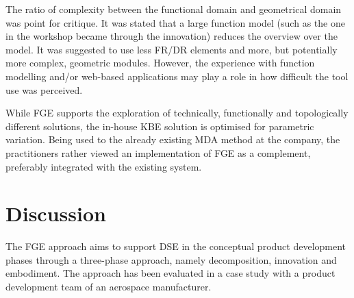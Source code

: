 \documentclass[aerospace,article,submit,moreauthors,pdftex]{Definitions/mdpi}
\begin{document}
The ratio of complexity between the functional domain and geometrical domain was point for critique.
It was stated that a large function model (such as the one in the workshop became through the innovation) reduces the overview over the model.
It was suggested to use less FR/DR elements and more, but potentially more complex, geometric modules.
However, the experience with function modelling and/or web-based applications may play a role in how difficult the tool use was perceived.

While FGE supports the exploration of technically, functionally and topologically different solutions, the in-house KBE solution is optimised for parametric variation.
Being used to the already existing MDA method at the company, the practitioners rather viewed an implementation of FGE as a complement, preferably integrated with the existing system. 






\section{Discussion} \label{sec:discussion}
The \ac{FGE} approach aims to support \ac{DSE} in the conceptual product development phases through a three-phase approach, namely decomposition, innovation and embodiment.
The approach has been evaluated in a case study with a product development team of an aerospace manufacturer.
\end{document}
